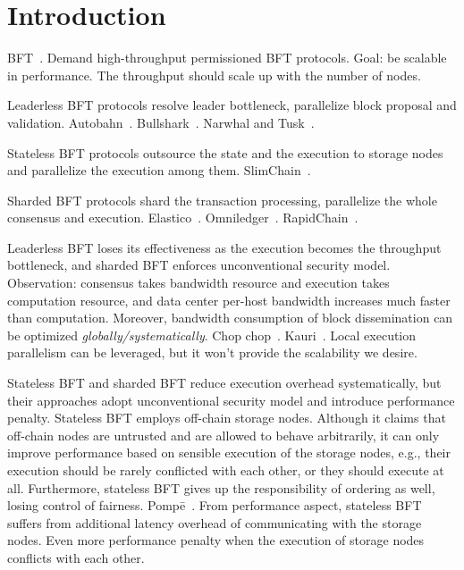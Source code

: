 \section{Introduction}

BFT~\cite{bgp}.
Demand high-throughput permissioned BFT protocols.
Goal: be scalable in performance.
The throughput should scale up with the number of nodes.

Leaderless BFT protocols resolve leader bottleneck, parallelize block proposal and validation.
Autobahn~\cite{autobahn}.
Bullshark~\cite{bullshark}.
Narwhal and Tusk~\cite{narwhal}.

Stateless BFT protocols outsource the state and the execution to storage nodes and parallelize the execution among them.
SlimChain~\cite{slimchain}.

Sharded BFT protocols shard the transaction processing, parallelize the whole consensus and execution.
Elastico~\cite{elastico}.
Omniledger~\cite{omniledger}.
RapidChain~\cite{rapidchain}.

Leaderless BFT loses its effectiveness as the execution becomes the throughput bottleneck, and sharded BFT enforces unconventional security model.
Observation: consensus takes bandwidth resource and execution takes computation resource, and data center per-host bandwidth increases much faster than computation.
Moreover, bandwidth consumption of block dissemination can be optimized \emph{globally\slash systematically}.
Chop chop~\cite{chop}.
Kauri~\cite{kauri}.
Local execution parallelism can be leveraged, but it won't provide the scalability we desire.

Stateless BFT and sharded BFT reduce execution overhead systematically, but their approaches adopt unconventional security model and introduce performance penalty.
Stateless BFT employs off-chain storage nodes.
Although it claims that off-chain nodes are untrusted and are allowed to behave arbitrarily, it can only improve performance based on sensible execution of the storage nodes, e.g., their execution should be rarely conflicted with each other, or they should execute at all.
Furthermore, stateless BFT gives up the responsibility of ordering as well, losing control of fairness.
Pomp\=e~\cite{pompe}.
From performance aspect, stateless BFT suffers from additional latency overhead of communicating with the storage nodes.
Even more performance penalty when the execution of storage nodes conflicts with each other.


